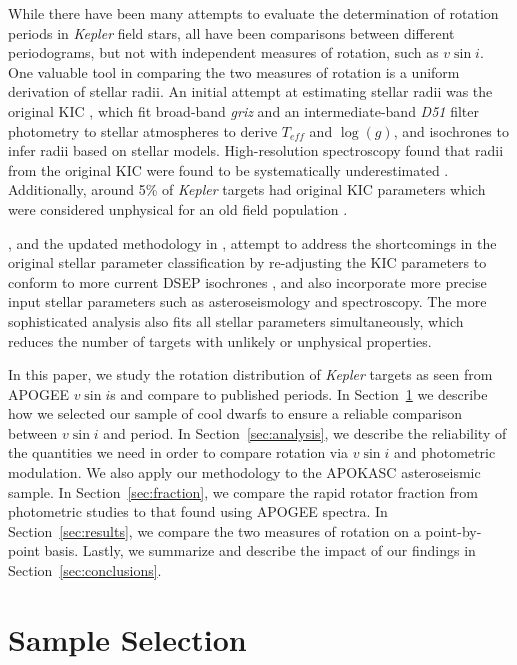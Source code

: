 \documentclass[manuscript]{aastex6}
\newcommand{\vsini}{\ensuremath{v \sin i}}
\newcommand{\Kepler}{\mbox{\textit{Kepler}}}
\newcommand{\Teff}{\ensuremath{T_{eff}}}
\newcommand{\logg}{\ensuremath{\log(g)}}
\begin{document}
While there have been many attempts to evaluate the determination of rotation
periods in \Kepler{} field stars, all have been 
comparisons between different periodograms, but not with independent 
measures of rotation, such as \vsini.  One valuable tool in comparing the two
measures of rotation is a uniform derivation of stellar radii. An initial attempt 
at estimating stellar radii was the original KIC \citep{Brown11}, which fit 
broad-band \textit{griz} and an intermediate-band \textit{D51} filter 
photometry to \citet{Castelli04} stellar atmospheres to derive \Teff{} and
\logg{}, and \citet{Girardi00} isochrones to infer radii based on stellar
models. High-resolution spectroscopy found that radii from the original 
KIC were found to be systematically underestimated \citep{Everett13}. 
Additionally, around 5\% of \Kepler{} targets had original KIC parameters which 
were considered unphysical for an 
old field population \citep{Batalha13}. 

\citet{Huber14}, and the updated methodology in \citet{Mathur17}, attempt to
address the shortcomings in the original stellar parameter classification by
re-adjusting the KIC parameters to conform to more current DSEP isochrones 
\citep{Dotter08}, and also incorporate more precise input stellar parameters 
such as asteroseismology and spectroscopy. The more sophisticated analysis also
fits all stellar parameters simultaneously, which reduces the number of targets
with unlikely or unphysical properties.

In this paper, we study the rotation distribution of \Kepler{} targets as
seen from APOGEE \vsini{}s and compare to published periods. In 
Section~\ref{sec:sample} we describe how we
selected our sample of cool dwarfs to ensure a reliable comparison between
\vsini{} and period. In Section~\ref{sec:analysis}, we describe the reliability
of the quantities we need in order to compare rotation via \vsini{} and
photometric modulation. We also apply our methodology to the APOKASC
asteroseismic sample. In Section~\ref{sec:fraction}, we compare the rapid
rotator fraction from photometric studies to that found using APOGEE spectra.  
In Section~\ref{sec:results}, we compare the two measures of rotation on a
point-by-point basis. Lastly, we summarize and describe
the impact of our findings in Section~\ref{sec:conclusions}.

\section{Sample Selection}
\label{sec:sample}
\end{document}
